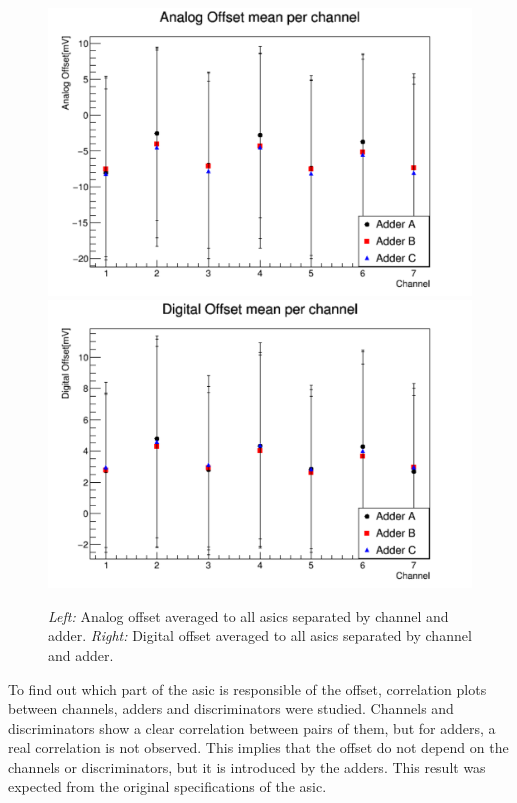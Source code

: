 \documentclass[main.tex]{subfiles}
\begin{document}
\begin{figure}[h]
  \centering
  \includegraphics[width=\textwidth]{./Pictures/analogch.pdf}
  \endminipage
  \includegraphics[width=\textwidth]{./Pictures/digitalch.pdf}
  \endminipage
  \caption{\textit{Left:} Analog offset averaged to all \glspl{asic} separated by channel and adder. \textit{Right:} Digital offset averaged to all \glspl{asic} separated by channel and adder.}
  \label{fig:offch}
\end{figure}

To find out which part of the \gls{asic} is responsible of the offset, correlation plots between channels, adders and discriminators were studied. Channels and discriminators show a clear correlation between pairs of them, but for adders, a real correlation is not observed. This implies that the offset do not depend on the channels or discriminators, but it is introduced by the adders. This result was expected from the original specifications of the \gls{asic}.
\end{document}
